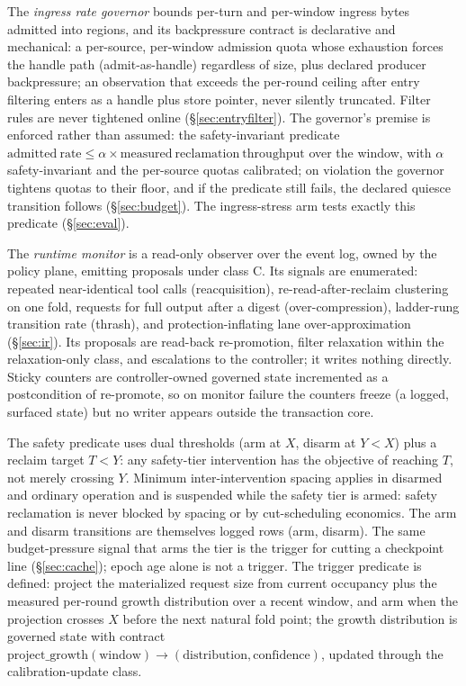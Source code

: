 \documentclass[11pt]{article}
\begin{document}
The \emph{ingress rate governor} bounds per-turn and per-window ingress bytes admitted into regions, and its backpressure contract is declarative and mechanical: a per-source, per-window admission quota whose exhaustion forces the handle path (admit-as-handle) regardless of size, plus declared producer backpressure; an observation that exceeds the per-round ceiling after entry filtering enters as a handle plus store pointer, never silently truncated. Filter rules are never tightened online (\S\ref{sec:entryfilter}). The governor's premise is enforced rather than assumed: the safety-invariant predicate $\mathrm{admitted\ rate} \le \alpha \times \mathrm{measured\ reclamation\ throughput}$ over the window, with $\alpha$ safety-invariant and the per-source quotas calibrated; on violation the governor tightens quotas to their floor, and if the predicate still fails, the declared quiesce transition follows (\S\ref{sec:budget}). The ingress-stress arm tests exactly this predicate (\S\ref{sec:eval}).

The \emph{runtime monitor} is a read-only observer over the event log, owned by the policy plane, emitting proposals under class C. Its signals are enumerated: repeated near-identical tool calls (reacquisition), re-read-after-reclaim clustering on one fold, requests for full output after a digest (over-compression), ladder-rung transition rate (thrash), and protection-inflating lane over-approximation (\S\ref{sec:ir}). Its proposals are read-back re-promotion, filter relaxation within the relaxation-only class, and escalations to the controller; it writes nothing directly. Sticky counters are controller-owned governed state incremented as a postcondition of re-promote, so on monitor failure the counters freeze (a logged, surfaced state) but no writer appears outside the transaction core.

The safety predicate uses dual thresholds (arm at $X$, disarm at $Y < X$) plus a reclaim target $T < Y$: any safety-tier intervention has the objective of reaching $T$, not merely crossing $Y$. Minimum inter-intervention spacing applies in disarmed and ordinary operation and is suspended while the safety tier is armed: safety reclamation is never blocked by spacing or by cut-scheduling economics. The arm and disarm transitions are themselves logged rows (arm, disarm). The same budget-pressure signal that arms the tier is the trigger for cutting a checkpoint line (\S\ref{sec:cache}); epoch age alone is not a trigger. The trigger predicate is defined: project the materialized request size from current occupancy plus the measured per-round growth distribution over a recent window, and arm when the projection crosses $X$ before the next natural fold point; the growth distribution is governed state with contract $\mathrm{project\_growth}(\mathrm{window}) \to (\mathrm{distribution}, \mathrm{confidence})$, updated through the calibration-update class.
\end{document}
